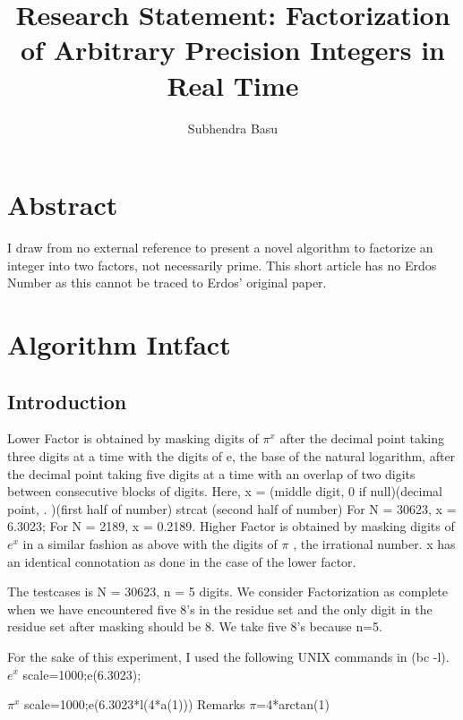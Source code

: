 \documentclass{article}
\title{Research Statement: Factorization of Arbitrary Precision Integers in Real Time}
\author{Subhendra Basu}
\begin{document}
\maketitle
\section{Abstract}
I draw from no external reference to present a novel algorithm to factorize an integer into two factors, not necessarily prime.
This short article has no Erdos Number as this cannot be traced to Erdos' original paper.

\section{Algorithm Intfact}
\subsection{Introduction}
Lower Factor is obtained by masking digits of $\pi^{x}$ after the decimal point taking three digits at a time with the digits of e, the 
base of the natural logarithm, after the decimal point taking five digits at a time with an overlap of two digits between consecutive blocks of digits.
Here, x = (middle digit, 0 if null)(decimal point, . )(first half of number) strcat (second half of number)
For N = 30623, x = 6.3023;
For N = 2189, x = 0.2189.
Higher Factor is obtained by masking digits of $e^{x}$ in a similar fashion as above with the digits of $\pi$ , the irrational number.
x has an identical connotation as done in the case of the lower factor.

The testcases is N = 30623, n = 5 digits.
We consider Factorization as complete when we have encountered five 8's in the residue set and the only digit in the residue set after masking should be 8.  We take five 8's because n=5. 

For the sake of this experiment, I used the following UNIX commands in (bc -l).
$e^{x}$ \:
scale=1000;e(6.3023);

$\pi^{x}$ \:
scale=1000;e(6.3023*l(4*a(1)))
Remarks\: $\pi$=4*arctan(1)
\end{document}
